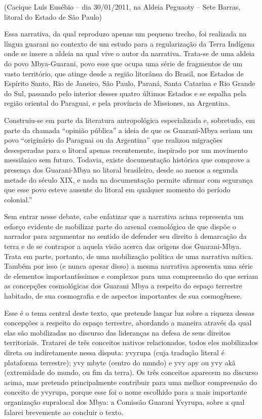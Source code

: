 \documentclass{article}
\begin{document}
(Cacique Lu\'is Eus\'ebio -- dia 30/01/2011, na Aldeia Peguaoty -- Sete
Barras, litoral do Estado de S\~ao Paulo)

Essa narrativa, da qual reproduzo apenas um pequeno trecho, foi
realizada na l\'ingua guarani no contexto de um estudo para a
regulariza\c{c}\~ao da Terra Ind\'igena onde se insere a aldeia na qual
vive o autor da narrativa. Trata-se de uma aldeia do povo Mbya-Guarani,
povo esse que ocupa uma s\'erie de fragmentos de um vasto territ\'orio,
que atinge desde a regi\~ao litor\^anea do Brasil, nos Estados de
Esp\'irito Santo, Rio de Janeiro, S\~ao Paulo, Paran\'a, Santa Catarina
e Rio Grande do Sul, passando pelo interior desses quatro \'ultimos
Estados e se espalha pela regi\~ao oriental do Paraguai, e pela
prov\'incia de Missiones, na Argentina.

Construiu-se em parte da literatura antropol\'ogica especializada e,
sobretudo, em parte da chamada {\textquotedblleft}opini\~ao
p\'ublica{\textquotedblright} a ideia de que os Guarani-Mbya seriam um
povo {\textquotedblleft}origin\'ario do Paraguai ou da
Argentina{\textquotedblright} que realizou migra\c{c}\~oes desesperadas
para o litoral apenas recentemente, inspirado por um movimento
messi\^anico sem futuro. Todavia, existe documenta\c{c}\~ao hist\'orica
que comprove a presen\c{c}a dos Guarani-Mbya no litoral brasileiro,
desde ao menos a segunda metade do s\'eculo XIX, e nada na
documenta\c{c}\~ao permite afirmar com seguran\c{c}a que esse povo
esteve ausente do litoral em qualquer momento do per\'iodo
colonial.{\textquotedblright}

Sem entrar nesse debate, cabe enfatizar que a narrativa acima representa
um esfor\c{c}o evidente de mobilizar parte do arsenal cosmol\'ogico de
que disp\~oe o narrador para argumentar no sentido de defender seu
direito \`a demarca\c{c}\~ao da terra e de se contrapor a aquela
vis\~ao acerca das origens dos Guarani-Mbya. Trata em parte, portanto,
de uma mobiliza\c{c}\~ao pol\'itica de uma narrativa m\'itica. Tamb\'em
por isso (e nunca apesar disso) a mesma narrativa apresenta uma s\'erie
de elementos important\'issimos e complexos para uma compreens\~ao do
que seriam as concep\c{c}\~oes cosmol\'ogicas dos Guarani Mbya a
respeito do espa\c{c}o terrestre habitado, de sua cosmografia e de
aspectos importantes de sua cosmog\^enese.

Esse \'e o tema central deste texto, que pretende lan\c{c}ar luz sobre a
riqueza dessas concep\c{c}\~oes a respeito do  espa\c{c}o terrestre, 
abordando a maneira atrav\'es da qual elas s\~ao mobilizadas no
discurso das lideran\c{c}as na defesa de seus direitos territoriais.
Tratarei de tr\^es conceitos nativos relacionados, todos eles
mobilizados direta ou indiretamente nessa disputa: yvyrupa (cuja
tradu\c{c}\~ao literal \'e plataforma terrestre); yvy mbyte (centro do
mundo) e yvy apy ou yvy ak\~a (extremidade do mundo, ou fim da terra).
Os tr\^es conceitos aparecem no discurso acima, mas pretendo
principalmente contribuir para uma melhor compreens\~ao do conceito de
yvyrupa, porque esse foi o nome escolhido para a mais importante
organiza\c{c}\~ao supralocal dos Mbya: a Comiss\~ao Guarani Yvyrupa,
sobre a qual falarei brevemente ao concluir o texto.
\end{document}
